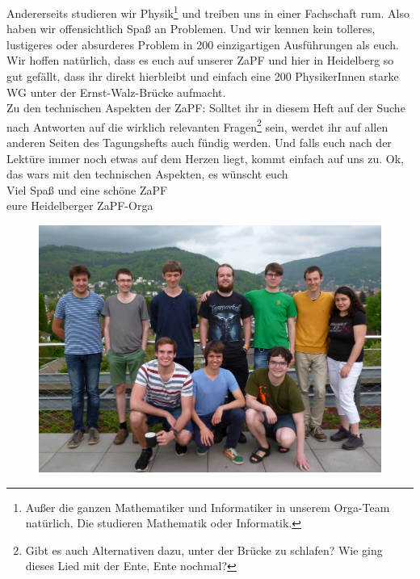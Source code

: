 Andererseits studieren wir Physik\footnote{Außer die ganzen Mathematiker und Informatiker in unserem Orga-Team natürlich. Die studieren Mathematik oder Informatik.} und treiben uns in einer Fachschaft rum. Also haben wir offensichtlich Spaß an Problemen. Und wir kennen kein tolleres, lustigeres oder absurderes Problem in 200 einzigartigen Ausführungen als euch.\\

Wir hoffen natürlich, dass es euch auf unserer ZaPF und hier in Heidelberg so gut gefällt, dass ihr direkt hierbleibt und einfach eine 200 PhysikerInnen starke WG unter der Ernst-Walz-Brücke aufmacht.\\

Zu den technischen Aspekten der ZaPF: Solltet ihr in diesem Heft auf der Suche nach Antworten auf die wirklich relevanten Fragen\footnote{Gibt es auch Alternativen dazu, unter der Brücke zu schlafen? Wie ging dieses Lied mit der Ente, Ente nochmal?} sein, werdet ihr auf allen anderen Seiten des Tagungshefts auch fündig werden. Und falls euch nach der Lektüre immer noch etwas auf dem Herzen liegt, kommt einfach auf uns zu. Ok, das wars mit den technischen Aspekten, es wünscht euch\\

Viel Spaß und eine schöne ZaPF\\

eure Heidelberger ZaPF-Orga\\

\begin{figure}[h]
\includegraphics[width=\textwidth]{media/orga}
\end{figure}